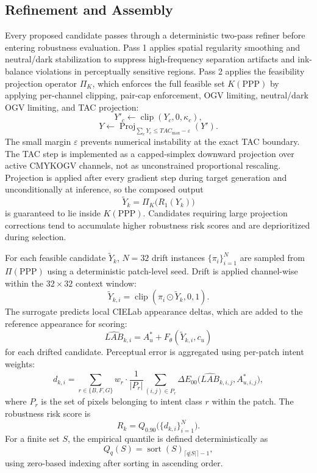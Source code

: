 \documentclass[11pt]{article}
\begin{document}
\subsection{Refinement and Assembly}

Every proposed candidate passes through a deterministic two-pass refiner before entering robustness evaluation. Pass 1 applies spatial regularity smoothing and neutral/dark stabilization to suppress high-frequency separation artifacts and ink-balance violations in perceptually sensitive regions. Pass 2 applies the feasibility projection operator $\Pi_K$, which enforces the full feasible set $K(\mathrm{PPP})$ by applying per-channel clipping, pair-cap enforcement, OGV limiting, neutral/dark OGV limiting, and TAC projection:
\[
Y'_c \leftarrow \operatorname{clip}(Y_c, 0, \kappa_c),
\]
\[
Y \leftarrow \operatorname{Proj}_{\sum_c Y_c \leq TAC_{\max}-\varepsilon}(Y').
\]
The small margin $\varepsilon$ prevents numerical instability at the exact TAC boundary. The TAC step is implemented as a capped-simplex downward projection over active CMYKOGV channels, not as unconstrained proportional rescaling. Projection is applied after every gradient step during target generation and unconditionally at inference, so the composed output
\[
\tilde{Y}_k = \Pi_K\bigl(R_1(Y_k)\bigr)
\]
is guaranteed to lie inside $K(\mathrm{PPP})$. Candidates requiring large projection corrections tend to accumulate higher robustness risk scores and are deprioritized during selection.

For each feasible candidate $\tilde{Y}_k$, $N = 32$ drift instances $\{\pi_i\}_{i=1}^{N}$ are sampled from $\Pi(\mathrm{PPP})$ using a deterministic patch-level seed. Drift is applied channel-wise within the $32\times 32$ context window:
\[
\tilde{Y}_{k,i} = \operatorname{clip}(\pi_i \odot \tilde{Y}_k, 0, 1).
\]
The surrogate predicts local CIELab appearance deltas, which are added to the reference appearance for scoring:
\[
\widehat{LAB}_{k,i} = A_u^* + F_{\theta}(\tilde{Y}_{k,i}, c_u)
\]
for each drifted candidate. Perceptual error is aggregated using per-patch intent weights:
\[
d_{k,i} =
\sum_{r \in \{B,F,G\}} w_r \cdot \frac{1}{|P_r|}
\sum_{(i,j)\in P_r}
\Delta E_{00}\!\bigl(\widehat{LAB}_{k,i,j}, A^*_{u,i,j}\bigr),
\]
where $P_r$ is the set of pixels belonging to intent class $r$ within the patch. The robustness risk score is
\[
R_k = Q_{0.90}\bigl(\{d_{k,i}\}_{i=1}^{N}\bigr).
\]
For a finite set $S$, the empirical quantile is defined deterministically as
\[
Q_q(S) = \operatorname{sort}(S)_{\lceil q|S| \rceil - 1},
\]
using zero-based indexing after sorting in ascending order.
\end{document}
